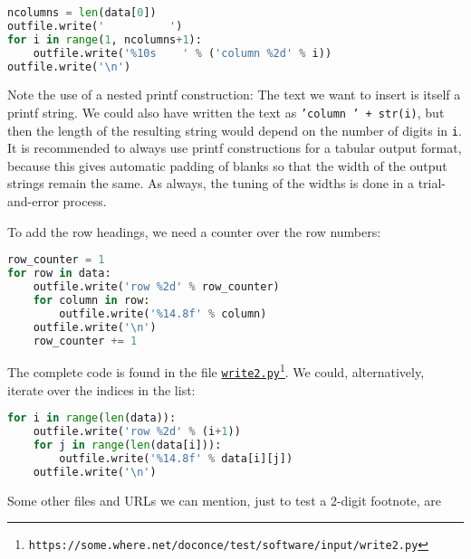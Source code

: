 \documentclass[graybox,sectrefs,envcountresetchap,open=right,final]{svmonodo}
\begin{document}
\begin{lstlisting}[language=python,style=simple,xleftmargin=2mm]
ncolumns = len(data[0])
outfile.write('          ')
for i in range(1, ncolumns+1):
    outfile.write('%10s    ' % ('column %2d' % i))
outfile.write('\n')

\end{lstlisting}

Note the use of a nested printf construction: The text we want to
insert is itself a printf string. We could also have written the
text as \texttt{'column  ' + str(i)}, but then the length of the
resulting string would depend on the number of digits in \texttt{i}.
It is recommended to always use printf constructions for
a tabular output format, because this gives automatic padding of
blanks so that the width of the output strings remain the same.
As always, the tuning of the widths is done in a trial-and-error
process.

To add the row headings, we need a counter over the row numbers:









\begin{lstlisting}[language=python,style=simple,xleftmargin=2mm]
row_counter = 1
for row in data:
    outfile.write('row %2d' % row_counter)
    for column in row:
        outfile.write('%14.8f' % column)
    outfile.write('\n')
    row_counter += 1

\end{lstlisting}

The complete code is found in the file \href{{https://some.where.net/doconce/test/software/input/write2.py}}{\nolinkurl{write2.py}\footnote{\texttt{https://some.where.net/doconce/test/software/input/write2.py}}}.
We could, alternatively, iterate over the indices in the list:







\begin{lstlisting}[language=python,style=simple,xleftmargin=2mm]
for i in range(len(data)):
    outfile.write('row %2d' % (i+1))
    for j in range(len(data[i])):
        outfile.write('%14.8f' % data[i][j])
    outfile.write('\n')

\end{lstlisting}

Some other files and URLs we can mention, just to test a 2-digit footnote,
are
\end{document}
